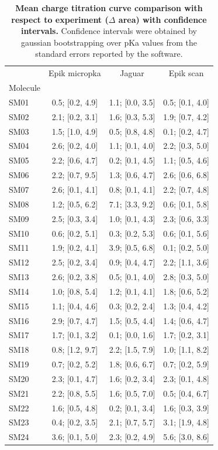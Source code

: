 \documentclass[9pt,lineno,final]{elife}
\begin{document}
\begin{table}[H]
\centering
 \caption{{\bf Mean charge titration curve comparison with respect to experiment ($\Delta$ area) with confidence intervals.} Confidence intervals were obtained by gaussian bootstrapping over pKa values from the standard errors reported by the software.}\label{tab:titrationcurves}
 \begin{tabular}{lccc}
\toprule
 &    Epik micropka &           Jaguar &        Epik scan \\
Molecule &                  &                  &                  \\
\midrule
SM01     &  0.5; [0.2, 4.9] &  1.1; [0.0, 3.5] &  0.5; [0.1, 4.0] \\
SM02     &  2.1; [0.2, 3.1] &  1.6; [0.3, 5.3] &  1.9; [0.7, 4.2] \\
SM03     &  1.5; [1.0, 4.9] &  0.5; [0.8, 4.8] &  0.1; [0.2, 4.7] \\
SM04     &  2.6; [0.2, 4.0] &  1.1; [0.1, 4.0] &  2.2; [0.3, 5.0] \\
SM05     &  2.2; [0.6, 4.7] &  0.2; [0.1, 4.5] &  1.1; [0.5, 4.6] \\
SM06     &  2.2; [0.7, 9.5] &  1.3; [0.6, 4.7] &  2.6; [0.6, 6.8] \\
SM07     &  2.6; [0.1, 4.1] &  0.8; [0.1, 4.1] &  2.2; [0.7, 4.8] \\
SM08     &  1.2; [0.5, 6.2] &  7.1; [3.3, 9.2] &  0.6; [0.1, 5.8] \\
SM09     &  2.5; [0.3, 3.4] &  1.0; [0.1, 4.3] &  2.3; [0.6, 3.3] \\
SM10     &  0.6; [0.2, 5.1] &  0.3; [0.2, 5.3] &  0.6; [0.1, 5.6] \\
SM11     &  1.9; [0.2, 4.1] &  3.9; [0.5, 6.8] &  0.1; [0.2, 5.0] \\
SM12     &  2.5; [0.2, 3.4] &  0.9; [0.4, 4.7] &  2.2; [1.1, 3.6] \\
SM13     &  2.6; [0.2, 3.8] &  0.5; [0.1, 4.0] &  2.8; [0.3, 5.0] \\
SM14     &  1.0; [0.8, 5.4] &  1.2; [0.1, 4.1] &  1.8; [0.6, 5.2] \\
SM15     &  1.1; [0.4, 4.6] &  0.3; [0.2, 2.4] &  1.3; [0.4, 4.2] \\
SM16     &  2.9; [0.7, 4.7] &  1.5; [0.5, 4.4] &  1.4; [0.6, 4.7] \\
SM17     &  1.7; [0.1, 3.2] &  0.1; [0.0, 1.6] &  1.7; [0.2, 3.1] \\
SM18     &  0.8; [1.2, 9.7] &  2.2; [1.5, 7.9] &  1.0; [1.1, 8.2] \\
SM19     &  0.7; [0.2, 5.2] &  1.8; [0.6, 6.7] &  0.7; [0.2, 5.9] \\
SM20     &  2.3; [0.1, 4.7] &  1.6; [0.2, 3.4] &  2.3; [0.1, 4.8] \\
SM21     &  2.2; [0.8, 5.5] &  1.6; [0.5, 7.0] &  0.5; [0.4, 6.7] \\
SM22     &  1.6; [0.5, 4.8] &  0.2; [0.1, 3.4] &  1.6; [0.3, 3.9] \\
SM23     &  0.4; [0.2, 3.5] &  2.1; [0.7, 5.7] &  3.1; [1.9, 4.8] \\
SM24     &  3.6; [0.1, 5.0] &  2.3; [0.2, 4.9] &  5.6; [3.0, 8.6] \\
\bottomrule
\end{tabular}
 

\end{table}
\end{document}
